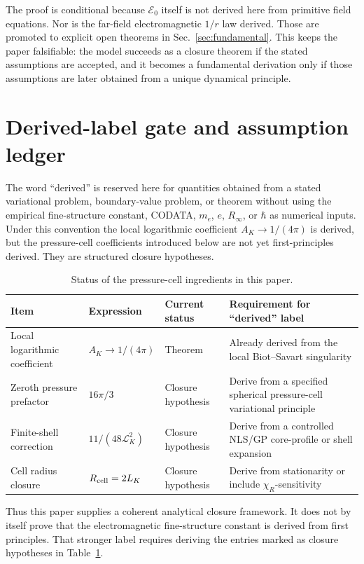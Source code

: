 \documentclass[11pt]{article}
\newcommand{\Ezero}{\mathcal E_0}
\begin{document}
The proof is conditional because \(\Ezero\) itself is not derived here from primitive field
equations.  Nor is the far-field electromagnetic \(1/r\) law derived.  Those are promoted to
explicit open theorems in Sec.~\ref{sec:fundamental}.  This keeps the paper falsifiable:
the model succeeds as a closure theorem if the stated assumptions are accepted, and it becomes
a fundamental derivation only if those assumptions are later obtained from a unique dynamical
principle.


\section{Derived-label gate and assumption ledger}
\label{sec:derived-label-gate}

The word ``derived'' is reserved here for quantities obtained from a stated
variational problem, boundary-value problem, or theorem without using the
empirical fine-structure constant, CODATA, \(m_e\), \(e\), \(R_\infty\), or
\(\hbar\) as numerical inputs.  Under this convention the local logarithmic
coefficient \(A_K\to1/(4\pi)\) is derived, but the pressure-cell coefficients
introduced below are not yet first-principles derived.  They are structured
closure hypotheses.

\begin{table}[h]
\centering
\caption{Status of the pressure-cell ingredients in this paper.}
\begin{tabular}{@{}llll@{}}
\toprule
Item & Expression & Current status & Requirement for ``derived'' label\\
\midrule
Local logarithmic coefficient &
\(A_K\to1/(4\pi)\) &
Theorem &
Already derived from the local Biot--Savart singularity\\
Zeroth pressure prefactor &
\(16\pi/3\) &
Closure hypothesis &
Derive from a specified spherical pressure-cell variational principle\\
Finite-shell correction &
\(11/(48\mathcal L_K^2)\) &
Closure hypothesis &
Derive from a controlled NLS/GP core-profile or shell expansion\\
Cell radius closure &
\(R_{\rm cell}=2L_K\) &
Closure hypothesis &
Derive from stationarity or include \(\chi_R\)-sensitivity\\
\bottomrule
\end{tabular}
\label{tab:derived-label-ledger}
\end{table}

Thus this paper supplies a coherent analytical closure framework.  It does not
by itself prove that the electromagnetic fine-structure constant is derived
from first principles.  That stronger label requires deriving the entries
marked as closure hypotheses in Table~\ref{tab:derived-label-ledger}.
\end{document}
